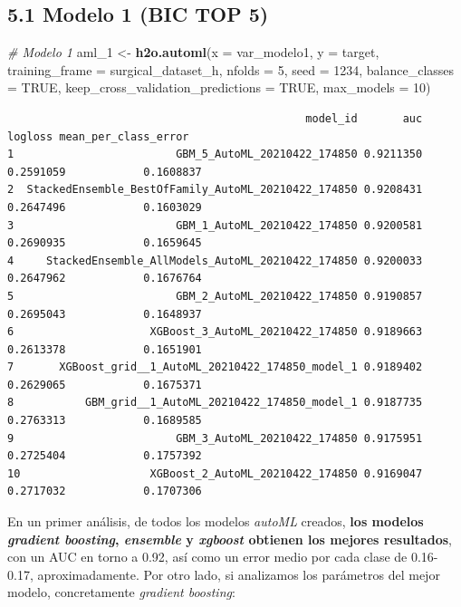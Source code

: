 \documentclass[
]{article}
\newenvironment{Shaded}{\begin{snugshade}}{\end{snugshade}}
\newcommand{\CommentTok}[1]{\textcolor[rgb]{0.56,0.35,0.01}{\textit{#1}}}
\newcommand{\DataTypeTok}[1]{\textcolor[rgb]{0.13,0.29,0.53}{#1}}
\newcommand{\DecValTok}[1]{\textcolor[rgb]{0.00,0.00,0.81}{#1}}
\newcommand{\KeywordTok}[1]{\textcolor[rgb]{0.13,0.29,0.53}{\textbf{#1}}}
\newcommand{\NormalTok}[1]{#1}
\newcommand{\OtherTok}[1]{\textcolor[rgb]{0.56,0.35,0.01}{#1}}
\newcommand{\StringTok}[1]{\textcolor[rgb]{0.31,0.60,0.02}{#1}}
\begin{document}
\hypertarget{modelo-1-bic-top-5}{%
\subsection{5.1 Modelo 1 (BIC TOP 5)}\label{modelo-1-bic-top-5}}

\begin{Shaded}
\begin{Highlighting}[]
\CommentTok{\#   Modelo 1}
\NormalTok{aml\_}\DecValTok{1}\NormalTok{ <{-}}\StringTok{ }\KeywordTok{h2o.automl}\NormalTok{(}\DataTypeTok{x =}\NormalTok{ var\_modelo1, }\DataTypeTok{y =}\NormalTok{ target, }
                    \DataTypeTok{training\_frame =}\NormalTok{ surgical\_dataset\_h, }\DataTypeTok{nfolds =} \DecValTok{5}\NormalTok{, }\DataTypeTok{seed =} \DecValTok{1234}\NormalTok{,}
                    \DataTypeTok{balance\_classes =} \OtherTok{TRUE}\NormalTok{, }\DataTypeTok{keep\_cross\_validation\_predictions =} \OtherTok{TRUE}\NormalTok{,}
                    \DataTypeTok{max\_models =} \DecValTok{10}\NormalTok{)}
\end{Highlighting}
\end{Shaded}

\begin{verbatim}
                                              model_id       auc   logloss mean_per_class_error
1                         GBM_5_AutoML_20210422_174850 0.9211350 0.2591059            0.1608837
2  StackedEnsemble_BestOfFamily_AutoML_20210422_174850 0.9208431 0.2647496            0.1603029
3                         GBM_1_AutoML_20210422_174850 0.9200581 0.2690935            0.1659645
4     StackedEnsemble_AllModels_AutoML_20210422_174850 0.9200033 0.2647962            0.1676764
5                         GBM_2_AutoML_20210422_174850 0.9190857 0.2695043            0.1648937
6                     XGBoost_3_AutoML_20210422_174850 0.9189663 0.2613378            0.1651901
7       XGBoost_grid__1_AutoML_20210422_174850_model_1 0.9189402 0.2629065            0.1675371
8           GBM_grid__1_AutoML_20210422_174850_model_1 0.9187735 0.2763313            0.1689585
9                         GBM_3_AutoML_20210422_174850 0.9175951 0.2725404            0.1757392
10                    XGBoost_2_AutoML_20210422_174850 0.9169047 0.2717032            0.1707306
\end{verbatim}

En un primer análisis, de todos los modelos \emph{autoML} creados,
\textbf{los modelos \emph{gradient boosting}, \emph{ensemble} y
\emph{xgboost} obtienen los mejores resultados}, con un AUC en torno a
0.92, así como un error medio por cada clase de 0.16-0.17,
aproximadamente. Por otro lado, si analizamos los parámetros del mejor
modelo, concretamente \emph{gradient boosting}:
\end{document}
